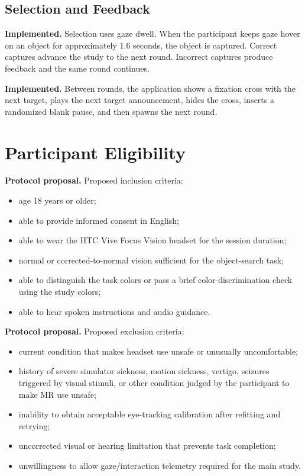 \documentclass[11pt,letterpaper]{article}
\newcommand{\status}[1]{\textbf{#1.}}
\begin{document}
\subsection{Selection and Feedback}

\status{Implemented} Selection uses gaze dwell. When the participant keeps gaze hover on an object for approximately 1.6 seconds, the object is captured. Correct captures advance the study to the next round. Incorrect captures produce feedback and the same round continues.

\status{Implemented} Between rounds, the application shows a fixation cross with the next target, plays the next target announcement, hides the cross, inserts a randomized blank pause, and then spawns the next round.

\section{Participant Eligibility}

\status{Protocol proposal} Proposed inclusion criteria:
\begin{itemize}
  \item age 18 years or older;
  \item able to provide informed consent in English;
  \item able to wear the HTC Vive Focus Vision headset for the session duration;
  \item normal or corrected-to-normal vision sufficient for the object-search task;
  \item able to distinguish the task colors or pass a brief color-discrimination check using the study colors;
  \item able to hear spoken instructions and audio guidance.
\end{itemize}

\status{Protocol proposal} Proposed exclusion criteria:
\begin{itemize}
  \item current condition that makes headset use unsafe or unusually uncomfortable;
  \item history of severe simulator sickness, motion sickness, vertigo, seizures triggered by visual stimuli, or other condition judged by the participant to make MR use unsafe;
  \item inability to obtain acceptable eye-tracking calibration after refitting and retrying;
  \item uncorrected visual or hearing limitation that prevents task completion;
  \item unwillingness to allow gaze/interaction telemetry required for the main study.
\end{itemize}
\end{document}
